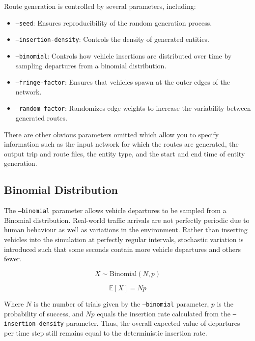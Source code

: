 \documentclass[a4paper]{report}
\begin{document}
Route generation is controlled by several parameters, including:
\begin{itemize}
    \item \texttt{--seed}: Ensures reproducibility of the random generation process.
    \item \texttt{--insertion-density}: Controls the density of generated entities.
    \item \texttt{--binomial}: Controls how vehicle insertions are distributed over time by sampling departures from a binomial distribution.
    \item \texttt{--fringe-factor}: Ensures that vehicles spawn at the outer edges of the network.
    \item \texttt{--random-factor}: Randomizes edge weights to increase the variability between generated routes.
\end{itemize}
There are other obvious parameters omitted which allow you to specify information such as the input network for which the routes are generated, the output trip and route files, the entity type, and the start and end time of entity generation.

\subsection{Binomial Distribution}

The \texttt{--binomial} parameter allows vehicle departures to be sampled from a Binomial distribution. Real-world traffic arrivals are not perfectly periodic due to human behaviour as well as variations in the environment. Rather than inserting vehicles into the simulation at perfectly regular intervals, stochastic variation is introduced such that some seconds contain more vehicle departures and others fewer.

\[
X \sim \mathrm{Binomial}(N, p)
\]

\[
\mathbb{E}[X] = Np
\]

Where \( N \) is the number of trials given by the \texttt{--binomial} parameter, \( p \) is the probability of success, and \( Np \) equals the insertion rate calculated from the \texttt{--insertion-density} parameter. Thus, the overall expected value of departures per time step still remains equal to the deterministic insertion rate.
\end{document}
